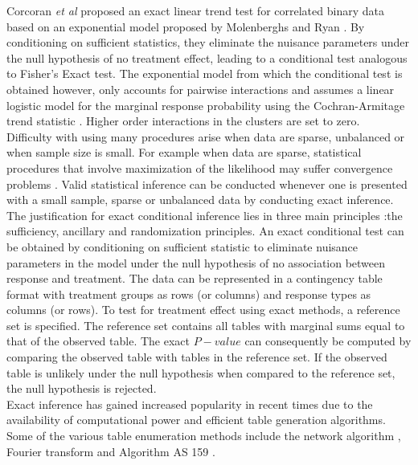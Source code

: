 \documentclass[12pt,oneside]{report}
\theoremstyle{definition}
\theoremstyle{mystyle}
\begin{document}
Corcoran \textit{et al} \cite{cocoran} proposed an exact linear trend test for correlated binary data based on an exponential model proposed by Molenberghs and Ryan \cite{molenberghs}. By conditioning on  sufficient statistics, they eliminate  the nuisance parameters under the null hypothesis of no treatment effect, leading to a conditional test analogous to  Fisher's Exact test. The exponential model from which the conditional test is obtained   however, only accounts for pairwise interactions and assumes a linear logistic model for the marginal response probability using the Cochran-Armitage trend statistic \cite{aniko}. Higher order interactions in the clusters are set to zero.\\
Difficulty with using many  procedures arise when data are sparse, unbalanced or when sample size is small. For example when  data  are sparse, statistical procedures that involve maximization of the likelihood may suffer convergence problems \cite{Agresti2001}. Valid statistical inference can be conducted whenever one is presented with a small sample, sparse or unbalanced data  by conducting exact inference. The justification for exact conditional inference lies in three main principles \cite{mehta1}:the sufficiency, ancillary and randomization principles. An   exact conditional test  can be  obtained by   conditioning on  sufficient statistic   to  eliminate   nuisance parameters in the model under the null hypothesis of  no association between response and treatment. The data can be represented in a contingency table format with treatment groups as rows (or columns) and response types as columns (or rows). To test for treatment effect using exact methods, a reference set is specified. The reference set contains all tables with marginal sums equal to that of the observed table. The   exact $P-value$  can consequently be computed by comparing the observed table with tables in the reference set. If the observed table is unlikely under the null hypothesis when compared to the reference set, the null hypothesis is rejected.\\
Exact inference has gained increased popularity  in recent times due to the availability of computational power and efficient  table generation algorithms. Some of the various table enumeration methods include the network algorithm \cite{Mehta1983}, Fourier transform and Algorithm AS 159 \cite{patefield}.
\end{document}
